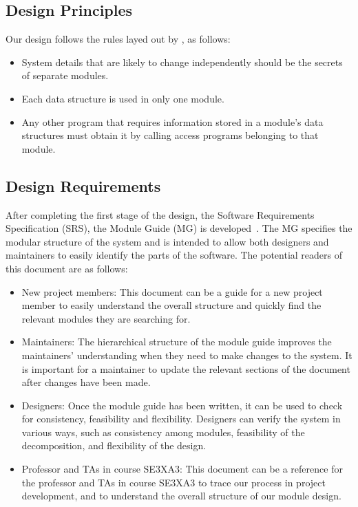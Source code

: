 \documentclass[12pt, titlepage]{article}
\begin{document}
\subsection{Design Principles}
Our design follows the rules layed out by \citet{ParnasEtAl1984}, as follows:
\begin{itemize}
\item System details that are likely to change independently should be the
  secrets of separate modules.
\item Each data structure is used in only one module.
\item Any other program that requires information stored in a module's data
  structures must obtain it by calling access programs belonging to that module.
\end{itemize}

\subsection{Design Requirements}
After completing the first stage of the design, the Software Requirements
Specification (SRS), the Module Guide (MG) is developed~\citep{ParnasEtAl1984}. The MG
specifies the modular structure of the system and is intended to allow both
designers and maintainers to easily identify the parts of the software.  The
potential readers of this document are as follows:

\begin{itemize}
\item New project members: This document can be a guide for a new project member
  to easily understand the overall structure and quickly find the
  relevant modules they are searching for.
\item Maintainers: The hierarchical structure of the module guide improves the
  maintainers' understanding when they need to make changes to the system. It is
  important for a maintainer to update the relevant sections of the document
  after changes have been made.
\item Designers: Once the module guide has been written, it can be used to
  check for consistency, feasibility and flexibility. Designers can verify the
  system in various ways, such as consistency among modules, feasibility of the
  decomposition, and flexibility of the design.
\item Professor and TAs in course SE3XA3: This document can be a reference for the professor and TAs in course SE3XA3 to trace our process in project development, and to understand the overall structure of our module design.
\end{itemize}
\end{document}
